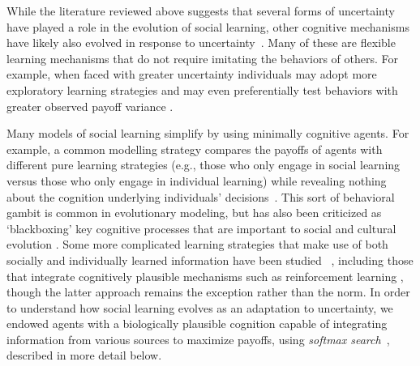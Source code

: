 \documentclass[letterpaper,11.5pt]{scrartcl}
\newcommand{\cm}[1]{{\textcolor{mypurple} {({\tiny CM:} #1)}}}
\begin{document}
While the literature reviewed above suggests that
several forms of uncertainty have played a role in the evolution of social
learning, other cognitive mechanisms have likely also evolved in response to
uncertainty~\cite{volz2012,johnson2013evolution,van2018uncertainty}. Many of these are flexible learning mechanisms that
do not require imitating the behaviors of others. For example, when faced with greater uncertainty individuals may adopt more exploratory learning strategies and may even preferentially test behaviors with greater observed payoff variance 
\cite{Wilson2014,Gershman2019}.

Many models of social learning simplify by using minimally cognitive %
agents. For example, a common modelling strategy compares the payoffs of
agents with different pure learning strategies (e.g., those who only engage in social
learning versus those who only engage in individual learning) while revealing nothing about the
cognition underlying individuals' decisions~\cite{BoydRicherson1985, Rogers1988,
aoki2005}. This sort of behavioral gambit is common in evolutionary modeling, but has also been criticized as `blackboxing' key cognitive processes that are important to social and cultural evolution \cite{Heyes2016,Kendal2018}.  
Some more complicated learning strategies that make use of both socially and individually learned information have been studied ~\cite{Enquist2007, perreault2012bayesian}, including those that integrate cognitively plausible mechanisms such as reinforcement learning \cite{lindstrom2016co}, though the latter approach remains the exception rather than the norm. 
In order to understand how social learning evolves as an adaptation to uncertainty, we 
endowed agents with a biologically plausible cognition capable of integrating information from various sources to maximize payoffs, using \emph{softmax
search}~\cite{Gershman2019}, described in more detail below. 
\end{document}
